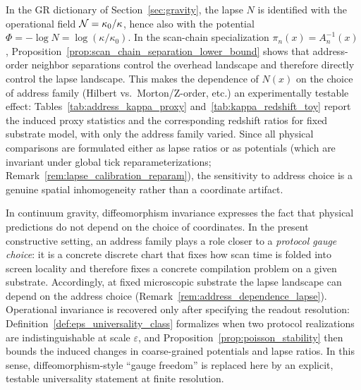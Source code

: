 \begin{remark}
\label{rem:address_dependence_lapse}
In the GR dictionary of Section~\ref{sec:gravity}, the lapse $N$ is identified with the operational field $\mathcal{N}=\kappa_0/\kappa$, hence also with the potential $\Phi=-\log N=\log(\kappa/\kappa_0)$.
In the scan-chain specialization $\pi_n(x)=A_n^{-1}(x)$, Proposition~\ref{prop:scan_chain_separation_lower_bound} shows that address-order neighbor separations control the overhead landscape and therefore directly control the lapse landscape.
This makes the dependence of $N(x)$ on the choice of address family (Hilbert vs.\ Morton/Z-order, etc.) an experimentally testable effect: Tables~\ref{tab:address_kappa_proxy} and~\ref{tab:kappa_redshift_toy} report the induced proxy statistics and the corresponding redshift ratios for fixed substrate model, with only the address family varied.
Since all physical comparisons are formulated either as lapse ratios or as potentials (which are invariant under global tick reparameterizations; Remark~\ref{rem:lapse_calibration_reparam}), the sensitivity to address choice is a genuine spatial inhomogeneity rather than a coordinate artifact.
\end{remark}

\begin{remark}
\label{rem:address_as_gauge}
In continuum gravity, diffeomorphism invariance expresses the fact that physical predictions do not depend on the choice of coordinates.
In the present constructive setting, an address family plays a role closer to a \emph{protocol gauge choice}: it is a concrete discrete chart that fixes how scan time is folded into screen locality and therefore fixes a concrete compilation problem on a given substrate.
Accordingly, at fixed microscopic substrate the lapse landscape can depend on the address choice (Remark~\ref{rem:address_dependence_lapse}).
Operational invariance is recovered only after specifying the readout resolution: Definition~\ref{def:eps_universality_class} formalizes when two protocol realizations are indistinguishable at scale $\varepsilon$, and Proposition~\ref{prop:poisson_stability} then bounds the induced changes in coarse-grained potentials and lapse ratios.
In this sense, diffeomorphism-style ``gauge freedom'' is replaced here by an explicit, testable universality statement at finite resolution.
\end{remark}

